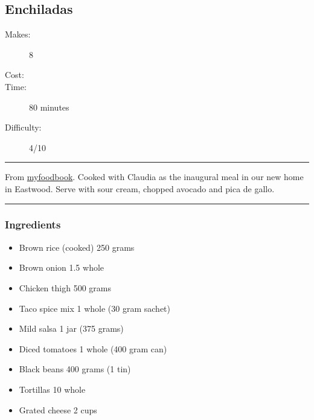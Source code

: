 \documentclass[]{article}
\begin{document}
\subsection*{\center\huge Enchiladas}
\begin{description}
\item[Makes:] 8 
\item[Cost:] \textdollar
\item[Time:] 80 minutes
\item[Difficulty:] 4/10
\end{description}
\vspace{0.2cm}\hrule\vspace{0.5cm}
\begin{adjustwidth}{0.5 cm}{0.5 cm}

From \href{https://myfoodbook.com.au/recipes/show/chicken-and-rice-enchiladas}{myfoodbook}. Cooked with Claudia as the inaugural meal in our new home in Eastwood. Serve with sour cream, chopped avocado and pica de gallo. \hfill{}\color{black}

\end{adjustwidth}
\vspace{0.5cm}\hrule
\subsubsection*{\Large Ingredients}
\begin{multicols}{2}
\begin{itemize}
 \item Brown rice (cooked) \hfill 250 grams
 \item Brown onion \hfill 1.5 whole
 \item Chicken thigh \hfill 500 grams
 \item Taco spice mix \hfill 1 whole (30 gram sachet)
 \item Mild salsa \hfill 1 jar (375 grams)
 \item Diced tomatoes \hfill 1 whole (400 gram can)
 \item Black beans \hfill 400 grams (1 tin)
 \item Tortillas \hfill 10 whole
 \item Grated cheese \hfill 2 cups
\end{itemize}
\end{multicols}
\end{document}
